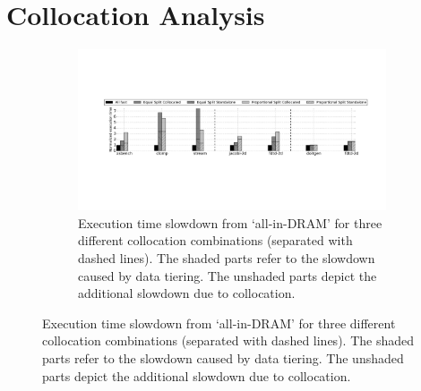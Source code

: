 \section{Collocation Analysis}
\label{sec:collocation}


\begin{figure}
  \centering
\begin{subfigure}{\linewidth}
  \includegraphics[width=\linewidth]{figures/tiering1.pdf}
      \captionsetup{labelformat=empty}
\caption{Execution time slowdown from `all-in-DRAM' for three different collocation combinations (separated with dashed lines). The shaded parts refer to the slowdown caused by data tiering. The unshaded parts depict the additional slowdown due to collocation. }
  \end{subfigure}


\end{figure}
